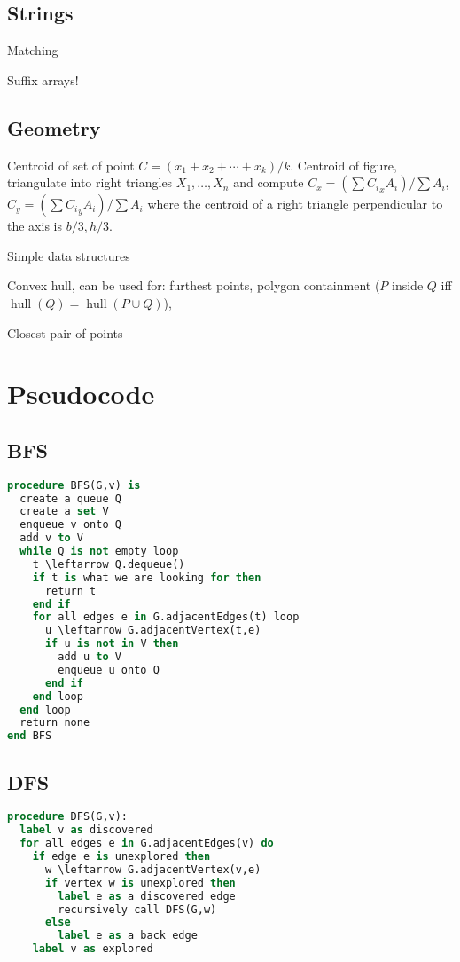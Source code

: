 \documentclass[10pt,a4paper]{article}
\newcommand{\codelisting}[1]{
  }
\begin{document}
\subsection*{Strings}
Matching
\codelisting{kmp.java}

Suffix arrays!
\codelisting{suffix.java}

\subsection*{Geometry}
Centroid of set of point $C = (x_1 + x_2 + \cdots + x_k) / k$.
Centroid of figure, triangulate into right triangles $X_1,\ldots,X_n$ and compute $C_x = (\sum {C_i}_x A_{i})/\sum A_i$, $C_y = (\sum {C_i}_y A_{i})/\sum A_i$ where the centroid of a right triangle perpendicular to the axis is $b/3,h/3$.

Simple data structures
\codelisting{Point.java}

Convex hull, can be used for: furthest points, polygon containment ($P$ inside $Q$ iff $\operatorname{hull}(Q)  = \operatorname{hull}(P\cup Q)$),
\codelisting{convexhull.java}

Closest pair of points
\codelisting{closestpoints.java}

\section*{Pseudocode}
\subsection*{BFS}
\begin{lstlisting}[language=Pascal]
procedure BFS(G,v) is
  create a queue Q
  create a set V
  enqueue v onto Q
  add v to V
  while Q is not empty loop
    t \leftarrow Q.dequeue()
    if t is what we are looking for then
      return t
    end if
    for all edges e in G.adjacentEdges(t) loop
      u \leftarrow G.adjacentVertex(t,e)
      if u is not in V then
        add u to V
        enqueue u onto Q
      end if
    end loop
  end loop
  return none
end BFS
\end{lstlisting}

\subsection*{DFS}
\begin{lstlisting}[language=Pascal]
procedure DFS(G,v):
  label v as discovered
  for all edges e in G.adjacentEdges(v) do
    if edge e is unexplored then
      w \leftarrow G.adjacentVertex(v,e)
      if vertex w is unexplored then
        label e as a discovered edge
        recursively call DFS(G,w)
      else
        label e as a back edge
    label v as explored
\end{lstlisting}
\end{document}
